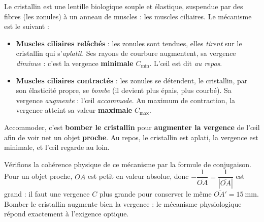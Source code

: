\documentclass[11pt]{article}
\newcommand{\cle}[1]{{\popxbold\color{popdark}#1}}
\begin{document}
Le cristallin est une lentille biologique souple et élastique, suspendue par des fibres (les zonules) à un anneau de muscles : les \cle{muscles ciliaires}. Le mécanisme est le suivant :

\begin{itemize}
\item \textbf{Muscles ciliaires relâchés} : les zonules sont tendues, elles \emph{tirent} sur le cristallin qui s'\emph{aplatit}. Ses rayons de courbure augmentent, sa vergence \emph{diminue} : c'est la vergence \textbf{minimale} $C_{\min}$. L'œil est dit \emph{au repos}.
\item \textbf{Muscles ciliaires contractés} : les zonules se détendent, le cristallin, par son élasticité propre, se \emph{bombe} (il devient plus épais, plus courbé). Sa vergence \emph{augmente} : l'œil \emph{accommode}. Au maximum de contraction, la vergence atteint sa valeur \textbf{maximale} $C_{\max}$.
\end{itemize}

\begin{aretenir}
Accommoder, c'est \textbf{bomber le cristallin} pour \textbf{augmenter la vergence} de l'œil afin de voir net un objet \textbf{proche}. Au repos, le cristallin est aplati, la vergence est minimale, et l'œil regarde au loin.
\end{aretenir}

Vérifions la cohérence physique de ce mécanisme par la formule de conjugaison. Pour un objet proche, $\overline{OA}$ est petit en valeur absolue, donc $-\dfrac{1}{\overline{OA}} = \dfrac{1}{|\overline{OA}|}$ est grand : il faut une vergence $C$ plus grande pour conserver le même $\overline{OA'} = \SI{15}{\milli\meter}$. Bomber le cristallin augmente bien la vergence : le mécanisme physiologique répond exactement à l'exigence optique.
\end{document}
